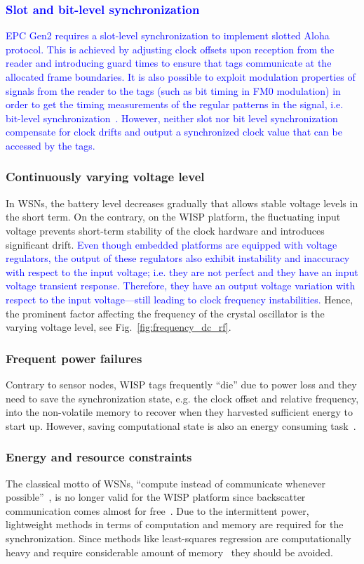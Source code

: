 \documentclass[10pt,journal,compsoc]{IEEEtran}
\newcommand{\add}[1]{\textcolor{blue}{#1}}
\begin{document}
\add{\subsubsection{Slot and bit-level synchronization} EPC Gen2 requires a slot-level synchronization to implement slotted Aloha protocol. This is achieved by adjusting clock offsets upon reception from the reader and introducing guard times to ensure that tags communicate at the
allocated frame boundaries. It is also possible to exploit modulation properties of signals from the reader to the tags (such as bit timing in FM0 modulation) in order to get the timing measurements of the regular patterns in the signal, i.e. bit-level synchronization~\cite{liu_tcomp_2015,liu_ton_2017,liu2_ton_2017}. However, neither slot nor bit level synchronization compensate for clock drifts and output a synchronized clock value that can be accessed by the tags.}

\subsubsection{Continuously varying voltage level} In WSNs, the battery level decreases gradually that allows stable voltage levels in the short term. On the contrary, on the WISP platform, the fluctuating input voltage prevents short-term stability of the clock hardware and introduces significant drift. \add{Even though embedded platforms are equipped with voltage regulators, the output of these regulators also exhibit instability and inaccuracy with respect to the input voltage; i.e. they are not perfect and they have an input voltage transient response. Therefore, they have an output voltage variation with respect to the input voltage---still leading to clock frequency instabilities.} Hence, the prominent factor affecting the frequency of the crystal oscillator is the varying voltage level, see Fig.~\ref{fig:frequency_dc_rf}.

\subsubsection{Frequent power failures} Contrary to sensor nodes, WISP tags frequently ``die'' due to power loss and they need to save the synchronization state, e.g. the clock offset and relative frequency, into the non-volatile memory to recover when they harvested sufficient energy to start up. However, saving computational state is also an energy consuming task~\cite{blisp}.

\subsubsection{Energy and resource constraints} The classical motto of WSNs, ``compute instead of communicate whenever possible''~\cite[p. 44]{karl2007protocols}, is no longer valid for the WISP platform since backscatter communication comes almost for free~\cite{ekhonet}. Due to the intermittent power, lightweight methods in terms of computation and memory are required for the synchronization. Since methods like least-squares regression are computationally heavy and require considerable amount of memory~\cite{pi2015} they should be avoided. 
\end{document}
